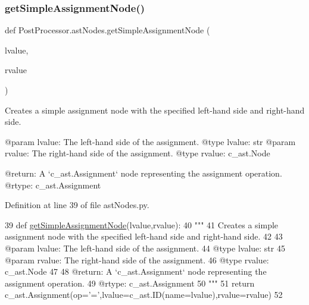 \subsubsection{\texorpdfstring{get\+Simple\+Assignment\+Node()}{getSimpleAssignmentNode()}}
{\footnotesize\ttfamily def Post\+Processor.\+ast\+Nodes.\+get\+Simple\+Assignment\+Node (\begin{DoxyParamCaption}\item[{}]{lvalue,  }\item[{}]{rvalue }\end{DoxyParamCaption})}

\begin{DoxyVerb}Creates a simple assignment node with the specified left-hand side and right-hand side.

@param lvalue: The left-hand side of the assignment.
@type lvalue: str
@param rvalue: The right-hand side of the assignment.
@type rvalue: c_ast.Node

@return: A `c_ast.Assignment` node representing the assignment operation.
@rtype: c_ast.Assignment
\end{DoxyVerb}
 

Definition at line 39 of file ast\+Nodes.\+py.


\begin{DoxyCode}
39 \textcolor{keyword}{def }\hyperlink{namespacePostProcessor_1_1astNodes_a1fc39a0ad420aefababe0a8ee2907f4e}{getSimpleAssignmentNode}(lvalue,rvalue):
40     \textcolor{stringliteral}{"""
}
41 \textcolor{stringliteral}{    Creates a simple assignment node with the specified left-hand side and right-hand side.
}
42 \textcolor{stringliteral}{
}
43 \textcolor{stringliteral}{    @param lvalue: The left-hand side of the assignment.
}
44 \textcolor{stringliteral}{    @type lvalue: str
}
45 \textcolor{stringliteral}{    @param rvalue: The right-hand side of the assignment.
}
46 \textcolor{stringliteral}{    @type rvalue: c\_ast.Node
}
47 \textcolor{stringliteral}{
}
48 \textcolor{stringliteral}{    @return: A `c\_ast.Assignment` node representing the assignment operation.
}
49 \textcolor{stringliteral}{    @rtype: c\_ast.Assignment
}
50 \textcolor{stringliteral}{    """}
51     \textcolor{keywordflow}{return} c\_ast.Assignment(op=\textcolor{stringliteral}{'='},lvalue=c\_ast.ID(name=lvalue),rvalue=rvalue)
52 
\end{DoxyCode}
